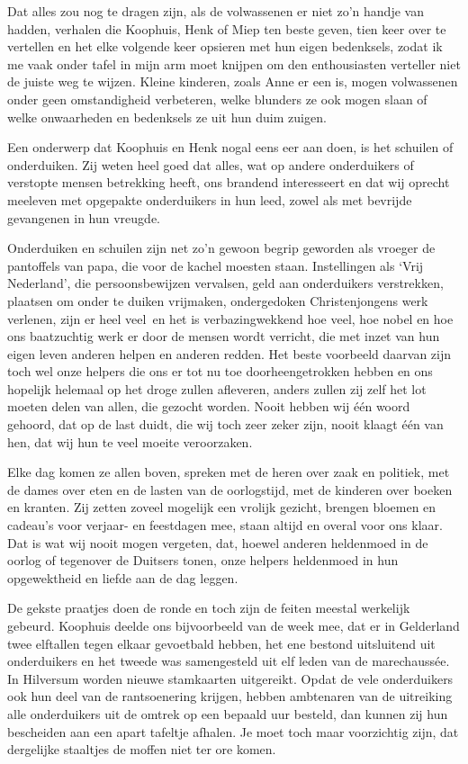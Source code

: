 \documentclass{book}
\begin{document}
Dat alles zou nog te dragen zijn, als de volwassenen er niet zo'n handje van
hadden, verhalen die Koophuis, Henk of Miep ten beste geven, tien keer over te
vertellen en het elke volgende keer opsieren met hun eigen bedenksels, zodat ik
me vaak onder tafel in mijn arm moet knijpen om den enthousiasten verteller niet
de juiste weg te wijzen. Kleine kinderen, zoals Anne er een is, mogen
volwassenen onder geen omstandigheid verbeteren, welke blunders ze ook mogen
slaan of welke onwaarheden en bedenksels ze uit hun duim zuigen.

Een onderwerp dat Koophuis en Henk nogal eens eer aan doen, is het schuilen of
onderduiken. Zij weten heel goed dat alles, wat op andere onderduikers of
verstopte mensen betrekking heeft, ons brandend interesseert en dat wij oprecht
meeleven met opgepakte onderduikers in hun leed, zowel als met bevrijde
gevangenen in hun vreugde.

Onderduiken en schuilen zijn net zo'n gewoon begrip geworden als vroeger de
pantoffels van papa, die voor de kachel moesten staan. Instellingen als `Vrij
Nederland', die persoonsbewijzen vervalsen, geld aan onderduikers verstrekken,
plaatsen om onder te duiken vrijmaken, ondergedoken Christenjongens werk
verlenen, zijn er heel veel~en het is verbazingwekkend hoe veel, hoe nobel en
hoe ons baatzuchtig werk er door de mensen wordt verricht, die met inzet van hun
eigen leven anderen helpen en anderen redden. Het beste voorbeeld daarvan zijn
toch wel onze helpers die ons er tot nu toe doorheengetrokken hebben en ons
hopelijk helemaal op het droge zullen afleveren, anders zullen zij zelf het lot
moeten delen van allen, die gezocht worden. Nooit hebben wij één woord gehoord,
dat op de last duidt, die wij toch zeer zeker zijn, nooit klaagt één van hen,
dat wij hun te veel moeite veroorzaken.

Elke dag komen ze allen boven, spreken met de heren over zaak en politiek, met
de dames over eten en de lasten van de oorlogstijd, met de kinderen over boeken
en kranten. Zij zetten zoveel mogelijk een vrolijk gezicht, brengen bloemen en
cadeau's voor verjaar- en feestdagen mee, staan altijd en overal voor ons klaar.
Dat is wat wij nooit mogen vergeten, dat, hoewel anderen heldenmoed in de oorlog
of tegenover de Duitsers tonen, onze helpers heldenmoed in hun opgewektheid en
liefde aan de dag leggen.

De gekste praatjes doen de ronde en toch zijn de feiten meestal werkelijk
gebeurd. Koophuis deelde ons bijvoorbeeld van de week mee, dat er in Gelderland
twee elftallen tegen elkaar gevoetbald hebben, het ene bestond uitsluitend uit
onderduikers en het tweede was samengesteld uit elf leden van de marechaussée.
In Hilversum worden nieuwe stamkaarten uitgereikt. Opdat de vele onderduikers
ook hun deel van de rantsoenering krijgen, hebben ambtenaren van de uitreiking
alle onderduikers uit de omtrek op een bepaald uur besteld, dan kunnen zij hun
bescheiden aan een apart tafeltje afhalen. Je moet toch maar voorzichtig zijn,
dat dergelijke staaltjes de moffen niet ter ore komen.
\end{document}

